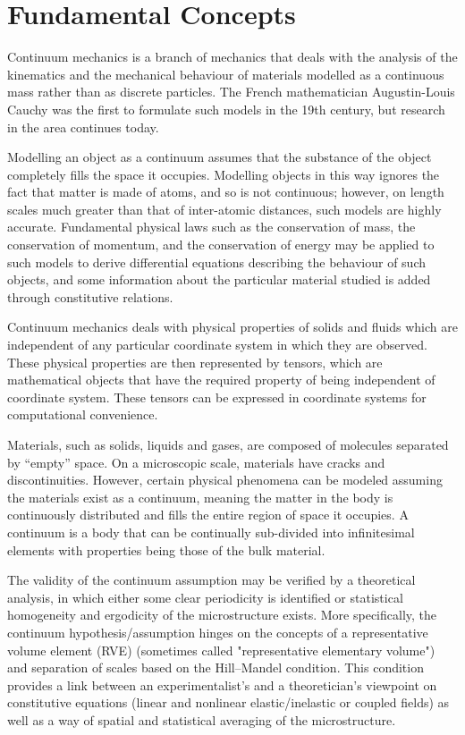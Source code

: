 \section {Fundamental Concepts}
Continuum mechanics is a branch of mechanics that deals with the analysis of the kinematics and the mechanical behaviour of materials modelled as a continuous mass rather than as discrete particles. The French mathematician Augustin-Louis Cauchy was the first to formulate such models in the 19th century, but research in the area continues today.

Modelling an object as a continuum assumes that the substance of the object completely fills the space it occupies. Modelling objects in this way ignores the fact that matter is made of atoms, and so is not continuous; however, on length scales much greater than that of inter-atomic distances, such models are highly accurate. Fundamental physical laws such as the conservation of mass, the conservation of momentum, and the conservation of energy may be applied to such models to derive differential equations describing the behaviour of such objects, and some information about the particular material studied is added through constitutive relations.

Continuum mechanics deals with physical properties of solids and fluids which are independent of any particular coordinate system in which they are observed. These physical properties are then represented by tensors, which are mathematical objects that have the required property of being independent of coordinate system. These tensors can be expressed in coordinate systems for computational convenience.

Materials, such as solids, liquids and gases, are composed of molecules separated by ``empty'' space. On a microscopic scale, materials have cracks and discontinuities. However, certain physical phenomena can be modeled assuming the materials exist as a continuum, meaning the matter in the body is continuously distributed and fills the entire region of space it occupies. A continuum is a body that can be continually sub-divided into infinitesimal elements with properties being those of the bulk material.

The validity of the continuum assumption may be verified by a theoretical analysis, in which either some clear periodicity is identified or statistical homogeneity and ergodicity of the microstructure exists. More specifically, the continuum hypothesis/assumption hinges on the concepts of a representative volume element (RVE) (sometimes called "representative elementary volume") and separation of scales based on the Hill–Mandel condition. This condition provides a link between an experimentalist's and a theoretician's viewpoint on constitutive equations (linear and nonlinear elastic/inelastic or coupled fields) as well as a way of spatial and statistical averaging of the microstructure.\cite{wiki:cm}


